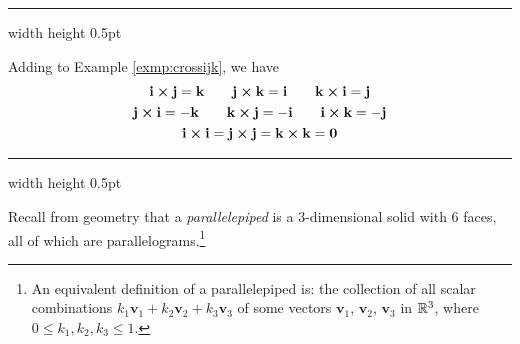 \vspace{2mm}
\hrule width \textwidth height 0.5pt
\begin{exmp}\label{exmp:crossijkfull}
 Adding to Example \ref{exmp:crossijk}, we have
 \begin{gather*}
  \textbf{i} \bm{\times} \textbf{j} = \textbf{k} \qquad \textbf{j} \bm{\times} \textbf{k} = \textbf{i} \qquad
   \textbf{k} \bm{\times} \textbf{i} = \textbf{j}\\
  \textbf{j} \bm{\times} \textbf{i} = -\textbf{k} \qquad \textbf{k} \bm{\times} \textbf{j} = -\textbf{i} \qquad
   \textbf{i} \bm{\times} \textbf{k} = -\textbf{j}\\
  \textbf{i} \bm{\times} \textbf{i} = \textbf{j} \bm{\times} \textbf{j} = \textbf{k} \bm{\times} \textbf{k} =
  \textbf{0}
 \end{gather*}
\end{exmp}
\hrule width \textwidth height 0.5pt
\vspace{4mm}

Recall from geometry that a \emph{parallelepiped} is a 3-dimensional solid with 6 faces, all of
which are parallelograms.\footnote{An equivalent definition of a  parallelepiped is: the collection of
all scalar combinations $k_{1}\textbf{v}_{1} + k_{2}\textbf{v}_{2} + k_{3}\textbf{v}_{3}$ of some vectors
$\textbf{v}_{1}$, $\textbf{v}_{2}$, $\textbf{v}_{3}$ in $\mathbb{R}^{3}$, where $0 \le k_{1}, k_{2}, k_{3} \le 1$.}

